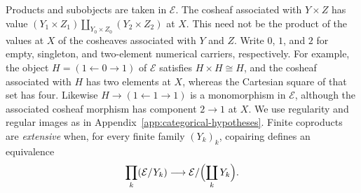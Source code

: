 Products and subobjects are taken in $\mathcal E$. The cosheaf
associated with $Y\times Z$ has value
$(Y_1\times Z_1)\amalg_{Y_0\times Z_0}(Y_2\times Z_2)$ at $X$.
This need not be the product of the values at $X$ of
the cosheaves associated with $Y$ and $Z$. Write $0$, $1$, and $2$
for empty, singleton, and two-element numerical carriers, respectively.
For example,
the object $H=(1\leftarrow0\to1)$ of $\mathcal E$ satisfies
$H\times H\cong H$,
and the cosheaf associated with $H$ has two elements at $X$,
whereas the Cartesian square of that set has four.
Likewise $H\to(1\leftarrow1\to1)$ is a monomorphism in $\mathcal E$,
although the associated cosheaf morphism has component $2\to1$ at $X$.
We use regularity and regular images as in
Appendix~\ref{app:categorical-hypotheses}.
Finite coproducts are \emph{extensive} when, for every finite family
$(Y_k)_k$, copairing defines an equivalence
\[
 \prod_k(\mathcal E/Y_k)\longrightarrow
 \mathcal E/\Bigl(\coprod_kY_k\Bigr).
\]

